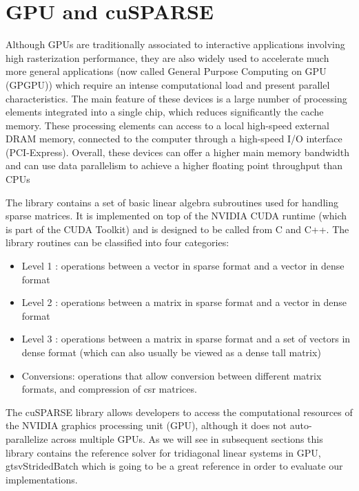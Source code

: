 \section{GPU and cuSPARSE}

Although GPUs are traditionally associated to interactive applications involving high
rasterization performance, they are also widely used to accelerate much more general
applications (now called General Purpose Computing on GPU (GPGPU)) which
require an intense computational load and present parallel characteristics. The main
feature of these devices is a large number of processing elements integrated into a single chip, which reduces significantly the cache memory. These processing elements
can access to a local high-speed external DRAM memory, connected to the computer
through a high-speed I/O interface (PCI-Express). Overall, these devices can offer a
higher main memory bandwidth and can use data parallelism to achieve a higher floating point throughput than CPUs

The \cite{cuSPARSE} library contains a set of basic linear algebra subroutines used for
handling sparse matrices. It is implemented on top of the NVIDIA CUDA runtime (which is part of the CUDA Toolkit) and is designed to be called from C and C++.
The library routines can be classified into four categories:

\begin{itemize}
    \item Level 1 : operations between a vector in sparse format and a vector in dense
    format
    \item Level 2 : operations between a matrix in sparse format and a vector in dense
    format
    \item Level 3 : operations between a matrix in sparse format and a set of vectors in
    dense format (which can also usually be viewed as a dense tall matrix)
    \item Conversions: operations that allow conversion between different matrix formats,
    and compression of csr matrices.
\end{itemize}

The cuSPARSE library allows developers to access the computational resources of the
NVIDIA graphics processing unit (GPU), although it does not auto-parallelize across
multiple GPUs. As we will see in subsequent sections this library contains the reference
solver for tridiagonal linear systems in GPU, gtsvStridedBatch which is going to be a
great reference in order to evaluate our implementations.


